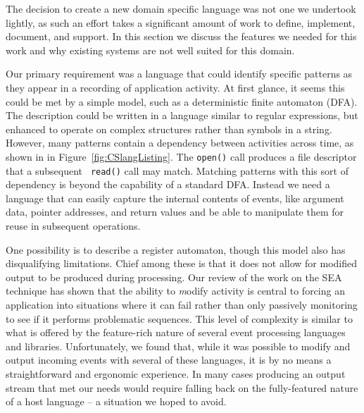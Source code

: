 The decision to create a new domain specific language was not one we
undertook lightly,
as such an effort takes
a significant amount of work
to define,
implement, document, and support.
In this section we discuss the features we needed for this work
and why existing systems are not well suited for this domain.

Our primary requirement was a language that could identify specific
patterns as they appear in a recording of application activity.
At first glance, it seems this could be met by a simple model,
such as a deterministic finite automaton (DFA).
The description could be written
in a language similar to
regular expressions, but enhanced to operate on complex
structures rather than symbols in a string.
However, many patterns contain a dependency
between activities
across time,
as shown in
in Figure~\ref{fig:CSlangListing}.
The {\tt open()} call produces a file descriptor that a subsequent {\tt
read()} call may match.
Matching patterns with this sort of dependency is beyond the capability
of a standard DFA.
Instead we need a language
that can easily capture
the internal contents of events,
like argument data,
pointer addresses,
and return values
and be able to
manipulate them for
reuse in subsequent operations.

One possibility is to describe a register automaton,
though this model also has disqualifying limitations.
Chief among these is that it does not allow for modified output to be
produced during processing.
Our review of the work on the SEA technique has shown that the ability to
{\textit modify} activity is central to forcing
an application into situations where
it can fail rather than only passively monitoring to see if it performs
problematic sequences.
This level of complexity is similar to what is offered by
the feature-rich nature of several event processing
languages and libraries.
Unfortunately, we found that, while it was possible to modify and output
incoming events with several of these languages,
it is by no means a straightforward
and ergonomic experience.
In many cases producing an output stream that met
our needs would require
falling back on the fully-featured nature of a host language -- a situation
we hoped to avoid.

